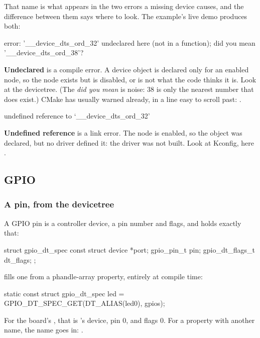 That name is what appears in the two errors a missing device causes, and the difference between them
says where to look. The  example’s live demo produces both:

\begin{console}
error: '__device_dts_ord_32' undeclared here (not in a function); did you mean '__device_dts_ord_38'?
\end{console}

\noindent \textbf{Undeclared} is a compile error. A device object is declared only for an enabled
node, so the node exists but is disabled, or is not what the code thinks it is. Look at the
devicetree. (The \emph{did you mean} is noise: 38 is only the nearest number that does exist.) CMake
has usually warned already, in a line easy to scroll past: .

\begin{console}
undefined reference to `__device_dts_ord_32'
\end{console}

\textbf{Undefined reference} is a link error. The node is enabled, so the object was declared, but
no driver defined it: the driver was not built. Look at Kconfig, here .

\subsection{GPIO}

\subsubsection{A pin, from the devicetree}
A GPIO pin is a controller device, a pin number and flags, and  holds
exactly that:

\begin{ccode}
struct gpio_dt_spec {
	const struct device *port;
	gpio_pin_t pin;
	gpio_dt_flags_t dt_flags;
};
\end{ccode}

\noindent {} fills one from a phandle-array property, entirely at
compile time:

\begin{ccode}
static const struct gpio_dt_spec led = GPIO_DT_SPEC_GET(DT_ALIAS(led0), gpios);
\end{ccode}

\noindent For the board’s , that is ’s device, pin 0, and flags 0. For a
property with another name, the name goes in: .

